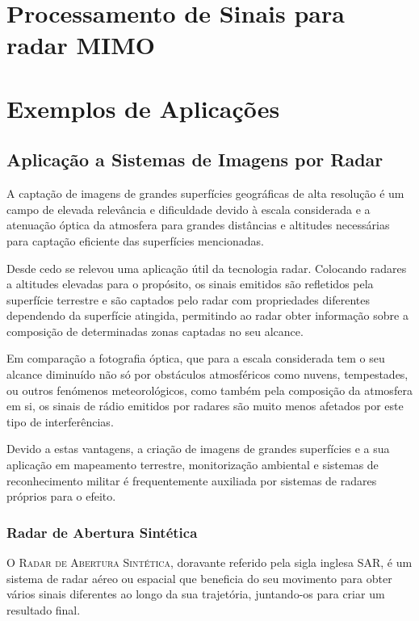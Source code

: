 \documentclass[purist,portuguese]{ist-report}
\begin{document}

\section{Processamento de Sinais para radar MIMO}



\section{Exemplos de Aplicações}

\subsection{Aplicação a Sistemas de Imagens por Radar}

A captação de imagens de grandes superfícies geográficas de alta resolução é um campo de elevada relevância e dificuldade devido à escala considerada e a atenuação óptica da atmosfera para grandes distâncias e altitudes necessárias para captação eficiente das superfícies mencionadas.

Desde cedo se relevou uma aplicação útil da tecnologia radar. Colocando radares a altitudes elevadas para o propósito, os sinais emitidos são refletidos pela superfície terrestre e são captados pelo radar com propriedades diferentes dependendo da superfície atingida, permitindo ao radar obter informação sobre a composição de determinadas zonas captadas no seu alcance.

Em comparação a fotografia óptica, que para a escala considerada tem o seu alcance diminuído não só por obstáculos atmosféricos como nuvens, tempestades, ou outros fenómenos meteorológicos, como também pela composição da atmosfera em si, os sinais de rádio emitidos por radares são muito menos afetados por este tipo de interferências.

Devido a estas vantagens, a criação de imagens de grandes superfícies e a sua aplicação em mapeamento terrestre, monitorização ambiental e sistemas de reconhecimento militar é frequentemente auxiliada por sistemas de radares próprios para o efeito.

\subsubsection{Radar de Abertura Sintética}

O \textsc{Radar de Abertura Sintética}, doravante referido pela sigla inglesa SAR, é um sistema de radar aéreo ou espacial que beneficia do seu movimento para obter vários sinais diferentes ao longo da sua trajetória, juntando-os para criar um resultado final. 

\printbibliography
\listoftodos
\end{document}
